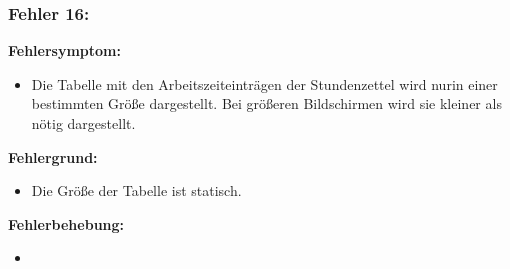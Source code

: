 \subsubsection{Fehler 16:}%
\textbf{Fehlersymptom:}
	\begin{itemize}
		\item Die Tabelle mit den Arbeitszeiteinträgen der Stundenzettel wird nurin einer bestimmten Größe dargestellt. Bei größeren Bildschirmen wird sie kleiner als nötig dargestellt.
	\end{itemize}
\textbf{Fehlergrund:}
	\begin{itemize}
		\item Die Größe der Tabelle ist statisch.
	\end{itemize}
\textbf{Fehlerbehebung:}
	\begin{itemize}
		\item 
	\end{itemize}

